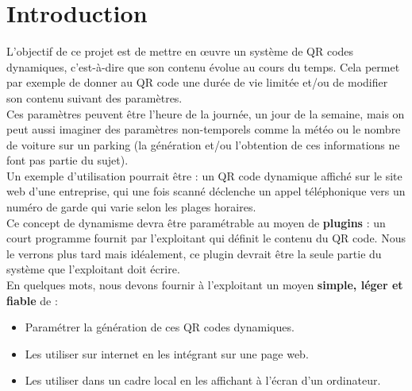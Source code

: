 \documentclass[a4paper,12pt]{article}
\begin{document}
\newpage

\tableofcontents
\newpage

\section{Introduction}


L'objectif de ce projet est de mettre en œuvre un système de QR codes dynamiques, c'est-à-dire que son contenu évolue au cours du temps. Cela permet par exemple de donner au QR code une durée de vie limitée et/ou de modifier son contenu suivant des paramètres.\\

\noindent Ces paramètres peuvent être l'heure de la journée, un jour de la semaine, mais on peut aussi imaginer des paramètres non-temporels comme la météo ou le nombre de voiture sur un parking (la génération et/ou l'obtention de ces informations ne font pas partie du sujet).\\

\noindent Un exemple d'utilisation pourrait être : un QR code dynamique affiché sur le site web d'une entreprise, qui une fois scanné déclenche un appel téléphonique vers un numéro de garde qui varie selon les plages horaires.\\

\noindent Ce concept de dynamisme devra être paramétrable au moyen de \textbf{plugins} : un court programme fournit par l'exploitant qui définit le contenu du QR code. Nous le verrons plus tard mais idéalement, ce plugin devrait être la seule partie du système que l'exploitant doit écrire.\\

\noindent En quelques mots, nous devons fournir à l'exploitant un moyen \textbf{simple, léger et fiable} de :
\begin{itemize}
\item Paramétrer la génération de ces QR codes dynamiques.
\item Les utiliser sur internet en les intégrant sur une page web.
\item Les utiliser dans un cadre local en les affichant à l'écran d'un ordinateur.\\
\end{itemize}
\end{document}
